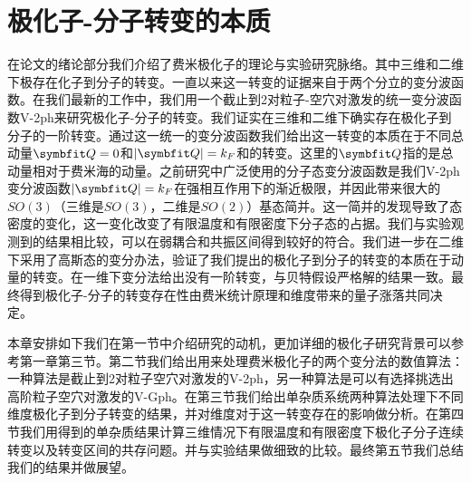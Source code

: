 \chapter{极化子-分子转变的本质}\label{chap2polaron}

在论文的绪论部分我们介绍了费米极化子的理论与实验研究脉络。其中三维和二维下极存在化子到分子的转变。一直以来这一转变的证据来自于两个分立的变分波函数。在我们最新的工作中，我们用一个截止到2对粒子-空穴对激发的统一变分波函数V-2ph来研究极化子-分子的转变。我们证实在三维和二维下确实存在极化子到分子的一阶转变。通过这一统一的变分波函数我们给出这一转变的本质在于不同总动量$\Vector{Q}=0$和$|\Vector{Q}|=k_F$和的转变。这里的$\Vector{Q}$指的是总动量相对于费米海的动量。之前研究中广泛使用的分子态变分波函数是我们V-2ph变分波函数$|\Vector{Q}|=k_F$在强相互作用下的渐近极限，并因此带来很大的$SO(3)$（三维是$SO(3)$，二维是$SO(2)$）基态简并。这一简并的发现导致了态密度的变化，这一变化改变了有限温度和有限密度下分子态的占据。我们与实验观测到的结果相比较，可以在弱耦合和共振区间得到较好的符合。我们进一步在二维下采用了高斯态的变分办法，验证了我们提出的极化子到分子的转变的本质在于动量的转变。在一维下变分法给出没有一阶转变，与贝特假设严格解的结果一致。最终得到极化子-分子的转变存在性由费米统计原理和维度带来的量子涨落共同决定。

本章安排如下我们在第一节中介绍研究的动机，更加详细的极化子研究背景可以参考第一章第三节。第二节我们给出用来处理费米极化子的两个变分法的数值算法：一种算法是截止到2对粒子空穴对激发的V-2ph，另一种算法是可以有选择挑选出高阶粒子空穴对激发的V-Gph。在第三节我们给出单杂质系统两种算法处理下不同维度极化子到分子转变的结果，并对维度对于这一转变存在的影响做分析。在第四节我们用得到的单杂质结果计算三维情况下有限温度和有限密度下极化子分子连续转变以及转变区间的共存问题。并与实验结果做细致的比较。最终第五节我们总结我们的结果并做展望。

